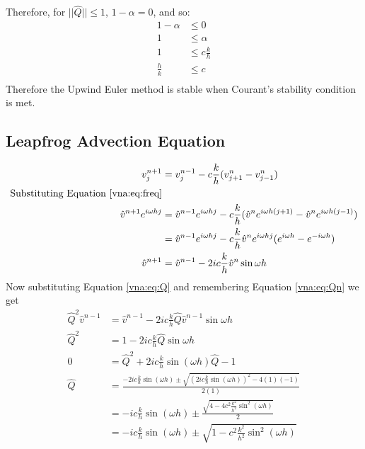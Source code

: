 Therefore, for $||\hat{Q}|| \leq 1$, $1-\alpha=0$, and so:
\begin{equation*}
\begin{align}
    1 - \alpha 	&\leq 0			\\
    1 		&\leq \alpha		\\
    1 		&\leq c \frac{k}{h}	\\
    \frac{h}{k}	&\leq c			\\
\end{align}
\end{equation*}
Therefore the Upwind Euler method is stable when Courant's stability condition is met.
\subsection{Leapfrog Advection Equation}
\begin{equation*}
\begin{align}
    v_j^{n+1}	&= v_j^{n-1} - c\frac{k}{h}(v_{j+1}^n - v_{j-1}^n) 										\\
    \text{Substituting Equation \ref{vna:eq:freq}} 												\\
    \hat{v}^{n+1}e^{i\omega hj} &= \hat{v}^{n-1}e^{i\omega hj} 	- c\frac{k}{h} (\hat{v}^ne^{i\omega h(j+1)} - \hat{v}^ne^{i\omega h(j-1)})	\\
				&= \hat{v}^{n-1}e^{i\omega hj} 	- c\frac{k}{h} \hat{v}^{n}e^{i\omega hj} (e^{i\omega h} - e^{-i\omega h})	\\
    \hat{v}^{n+1}		&= \hat{v}^{n-1}		- 2 i c\frac{k}{h} \hat{v}^{n} \sin \omega h					\\
\end{align}
\end{equation*}
Now substituting Equation \ref{vna:eq:Q} and remembering Equation \ref{vna:eq:Qn} we get
\begin{equation*}
\begin{align}
    \hat{Q}^2\hat{v}^{n-1}	&= \hat{v}^{n-1} - 2 i c\frac{k}{h} \hat{Q} \hat{v}^{n-1} \sin \omega h				\\
    \hat{Q}^2	&= 1 - 2 i c\frac{k}{h} \hat{Q} \sin \omega h									\\
    0 		&= \hat{Q}^2 + 2 i c\frac{k}{h} \sin( \omega h )\hat{Q} - 1							\\
    \hat{Q} 	& = \frac{-2 i c\frac{k}{h} \sin( \omega h ) \pm \sqrt{(2 i c\frac{k}{h} \sin( \omega h ))^2 - 4(1)(-1)}}{2(1)}	\\
		& = -i c\frac{k}{h} \sin( \omega h ) \pm \frac{ \sqrt{4 -4 c^2\frac{k^2}{h^2} \sin^2( \omega h )}}{2}		\\
		& = -i c\frac{k}{h} \sin( \omega h ) \pm \sqrt{1 -c^2\frac{k^2}{h^2} \sin^2( \omega h )}			\\
\end{align}
\end{equation*}
